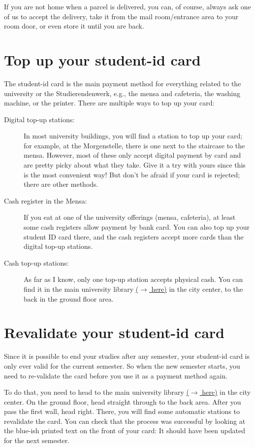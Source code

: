 If you are not home when a parcel is delivered, you can, of course, always ask one of us to accept the delivery, take it from the mail room/entrance area to your room door, or even store it until you are back.

\section{Top up your student-id card} \label{sec:qna-top-up-card}
The student-id card is the main payment method for everything related to the university or the Studierendenwerk, e.g., the mensa and cafeteria, the washing machine, or the printer. There are multiple ways to top up your card:
\begin{description}
    \item[Digital top-up stations:] In most university buildings, you will find a station to top up your card; for example, at the Morgenstelle, there is one next to the staircase to the mensa. However, most of these only accept digital payment by card and are pretty picky about what they take. Give it a try with yours since this is the most convenient way! But don't be afraid if your card is rejected; there are other methods.
    \item[Cash register in the Mensa:] If you eat at one of the university offerings (mensa, cafeteria), at least some cash registers allow payment by bank card. You can also top up your student ID card there, and the cash registers accept more cards than the digital top-up stations.
    \item[Cash top-up stations:] As far as I know, only one top-up station accepts physical cash. You can find it in the main university library \href{https://maps.app.goo.gl/ifwoMYV6JYGK6dXs7}{($\xrightarrow{}$ here)} in the city center, to the back in the ground floor area.
\end{description}

\section{Revalidate your student-id card}
Since it is possible to end your studies after any semester, your student-id card is only ever valid for the current semester. So when the new semester starts, you need to re-validate the card before you use it as a payment method again.

To do that, you need to head to the main university library \href{https://maps.app.goo.gl/ifwoMYV6JYGK6dXs7}{($\xrightarrow{}$ here)} in the city center. On the ground floor, head straight through to the back area. After you pass the first wall, head right. There, you will find some automatic stations to revalidate the card. You can check that the process was successful by looking at the blue-ish printed text on the front of your card: It should have been updated for the next semester.


